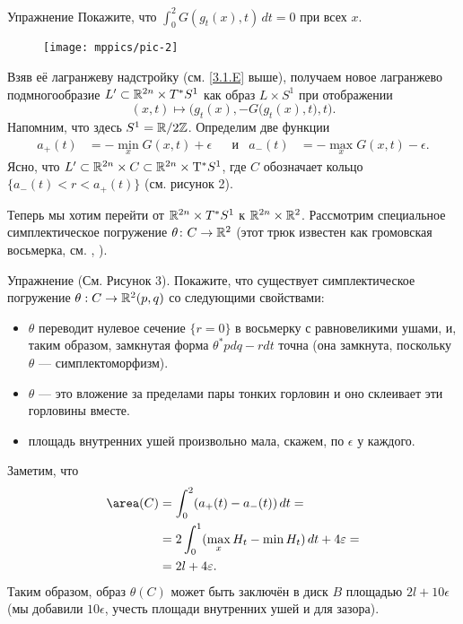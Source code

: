 \begin{ex*}{Упражнение}
Покажите, что $\int_0^2G (g_t (x), t)\,dt = 0$ при всех $x$.
\end{ex*}

\begin{figure}[ht!]
\vskip-0mm
\centering
\texttt{[image: mppics/pic-2]}
\caption{}\label{pic-2}
\vskip0mm
\end{figure}

Взяв её лагранжеву надстройку (см. \ref{3.1.E} выше),
получаем новое лагранжево подмногообразие $L' \subset \RR^{2n} \z\times T^{\ast} S^1$ как образ $L \times S^1$ при отображении 
\[(x, t) \mapsto \Big(g_t (x), -G \big(g_t (x), t\big), t\Big).\]
Напомним, что здесь $S^1 = \mathbb{R} / 2\mathbb{Z}$.
Определим две функции 
\begin{align*}a_+ (t) &= - \min_x G (x, t) + \epsilon
&&\text{и}&
a_- (t) &= - \max_x G (x, t) - \epsilon.
\end{align*}
Ясно, что $L' \subset \mathbb{R}^{2n} \times C \subset \mathbb{R}^{2n} \times \mathrm{T}^\ast S^1$, где $C$ обозначает кольцо 
$\{a_- (t) <r <a_+ (t)\}$
(см. рисунок 2).

Теперь мы хотим перейти от $\mathbb{R}^{2n} \times T^{\ast} S^1$ к $\mathbb{R}^{2n} \times \mathbb{R}^2$.
Рассмотрим специальное симплектическое погружение $\theta\colon C \to \mathbb{R}^2$
(этот трюк известен как громовская восьмерка, см. \cite{G1}, \cite{AL}).

\begin{ex*}{Упражнение}
(См. Рисунок 3).
Покажите, что существует симплектическое погружение $\theta: C \to \mathbb{R}^2 (p, q)$ со следующими свойствами: 
\begin{itemize}
\item $\theta$ переводит нулевое сечение $\{r = 0\}$ в восьмерку с равновеликими ушами, и, таким образом, замкнутая форма $\theta^\ast pdq - rdt$ точна (она замкнута, поскольку $\theta$ --- симплектоморфизм).
\item $\theta$ --- это вложение за пределами пары тонких горловин и оно склеивает эти горловины вместе.
\item площадь внутренних ушей произвольно мала, скажем, по $\epsilon$ у каждого. 
\end{itemize}
\end{ex*}

Заметим, что 
\begin{align*}
\area (C) 
&= \int_0^2(a_+ (t) - a_- (t))\,dt = 
\\
&=2 \int_0^1(\max_x H_t - \min H_t) \,dt + 4\epsilon =
\\
&=2l + 4\epsilon.
\end{align*}
Таким образом, образ $\theta (C)$ может быть заключён в диск $B$
площадью $2l + 10\epsilon$ (мы добавили $10\epsilon$,  учесть
  площади внутренних ушей и для зазора).

